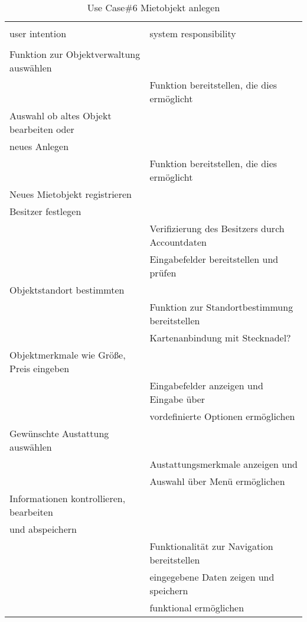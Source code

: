 \begin{table}[H]
\caption{Use Case\#6 Mietobjekt anlegen }
\centering
\begin{tabular}{l l}
\\ [-0.5ex]

\hline\hline
\\ [-0.5ex]
user intention & system responsibility
\\ [1.5ex]
\hline
\\ [-0.5ex]
Funktion zur Objektverwaltung auswählen		& 												\\[1ex]
											& Funktion bereitstellen, die dies ermöglicht	\\[1ex]
Auswahl ob altes Objekt bearbeiten oder		& 												\\[1ex]
neues Anlegen         						& 												\\[1ex]
											& Funktion bereitstellen, die dies ermöglicht	\\[1ex]
Neues Mietobjekt registrieren				& 											 	\\[1ex] 
Besitzer festlegen							& 											 	\\[1ex] 
											& Verifizierung des Besitzers durch Accountdaten \\[1ex]
											& Eingabefelder bereitstellen und prüfen 		\\[1ex]
Objektstandort bestimmten					& 					 							\\[1ex]
											& Funktion zur Standortbestimmung bereitstellen  \\[1ex]	
											& Kartenanbindung mit Stecknadel?			     \\[1ex]	
Objektmerkmale wie Größe, Preis eingeben	& 					 							\\[1ex]
											& Eingabefelder anzeigen und Eingabe über  		\\[1ex]
											& vordefinierte Optionen ermöglichen			\\[1ex]
Gewünschte Austattung auswählen				& 					 							\\[1ex]
											& Austattungsmerkmale anzeigen und 				\\[1ex]
											& Auswahl über Menü ermöglichen 				\\[1ex]
Informationen kontrollieren, bearbeiten 	& 												\\[1ex]
und abspeichern 							& 												\\[1ex]
										 	& Funktionalität zur Navigation bereitstellen	\\[1ex]
										 	& eingegebene Daten zeigen und speichern 		\\[1ex]
										 	& funktional ermöglichen						\\[1ex]



\hline
\end{tabular}
\label{tab:mietobjektAUC}
\end{table}


